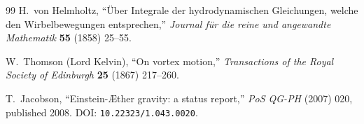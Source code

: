 \documentclass[11pt]{article}
\theoremstyle{definition}
\theoremstyle{plain}
\begin{document}
\begin{thebibliography}{99}
H.~von Helmholtz,
``\"Uber Integrale der hydrodynamischen Gleichungen, welche den Wirbelbewegungen entsprechen,''
\emph{Journal f\"ur die reine und angewandte Mathematik} \textbf{55} (1858) 25--55.

W.~Thomson (Lord Kelvin),
``On vortex motion,''
\emph{Transactions of the Royal Society of Edinburgh} \textbf{25} (1867) 217--260.

T.~Jacobson,
``Einstein-\AE ther gravity: a status report,''
\emph{PoS QG-PH} (2007) 020, published 2008.
DOI: \texttt{10.22323/1.043.0020}.

\end{thebibliography}
\end{document}
